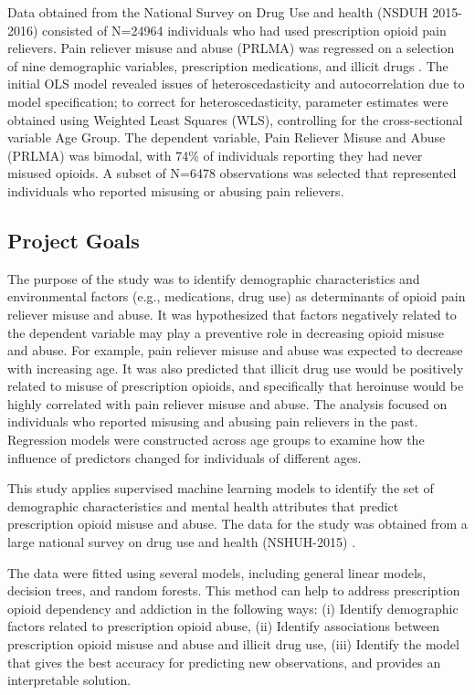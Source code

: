 \documentclass[sigconf]{acmart}
\begin{document}
Data obtained from the National Survey on Drug Use and health (NSDUH 2015-2016) 
consisted of N=24964 individuals who had used prescription opioid pain relievers. 
Pain reliever misuse and abuse (PRLMA) was regressed on a selection of nine 
demographic variables, prescription medications, and illicit drugs . 
The initial OLS model revealed issues of heteroscedasticity and autocorrelation 
due to model specification; to correct for heteroscedasticity, parameter 
estimates were obtained using Weighted Least Squares (WLS), controlling for 
the cross-sectional variable Age Group. The dependent variable, Pain Reliever 
Misuse and Abuse (PRLMA) was bimodal, with 74\% of individuals reporting they 
had never misused opioids. A subset of N=6478 observations was selected that 
represented individuals who reported misusing or abusing pain relievers. 


\subsection{Project Goals} 

The purpose of the study was to identify demographic characteristics and
environmental factors (e.g., medications, drug use) as determinants of opioid
pain reliever misuse and abuse. It was hypothesized that factors negatively 
related to the dependent variable may play a preventive role in decreasing
opioid misuse and abuse. For example, pain reliever misuse and abuse was 
expected to decrease with increasing age. It was also predicted that illicit 
drug use would be positively related to misuse of prescription opioids, and 
specifically that heroinuse would be highly correlated with pain reliever 
misuse and abuse. The analysis focused on individuals who reported misusing 
and abusing pain relievers in the past. Regression models were constructed 
across age groups to examine how the influence of predictors changed for 
individuals of different ages. 

This study 
applies supervised machine learning models to identify the set of demographic 
characteristics and mental health attributes that predict prescription opioid 
misuse and abuse. The data for the study was obtained from a large national 
survey on drug use and health (NSHUH-2015) \cite{samhsa16}. 

The data were fitted using several models, including general 
linear models, decision trees, and random forests. This method can help to 
address prescription opioid dependency and addiction in the following ways: 
(i) Identify demographic factors related to prescription opioid abuse, (ii) 
Identify associations between prescription opioid misuse and abuse and 
illicit drug use, (iii) Identify the model that gives the best accuracy
for predicting new observations, and provides an interpretable solution. 
\end{document}

